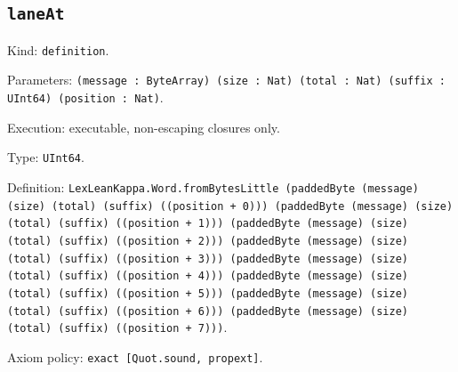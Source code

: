 \documentclass[11pt]{article}
\begin{document}
\subsection*{\texttt{laneAt}}
\noindent Kind: \texttt{definition}.\par
\noindent Parameters: \texttt{(message : ByteArray) (size : Nat) (total : Nat) (suffix : UInt64) (position : Nat)}.\par
\noindent Execution: executable, non-escaping closures only.\par
\noindent Type: \texttt{UInt64}.\par
\noindent Definition: \texttt{LexLeanKappa.Word.fromBytesLittle (paddedByte (message) (size) (total) (suffix) ((position + 0))) (paddedByte (message) (size) (total) (suffix) ((position + 1))) (paddedByte (message) (size) (total) (suffix) ((position + 2))) (paddedByte (message) (size) (total) (suffix) ((position + 3))) (paddedByte (message) (size) (total) (suffix) ((position + 4))) (paddedByte (message) (size) (total) (suffix) ((position + 5))) (paddedByte (message) (size) (total) (suffix) ((position + 6))) (paddedByte (message) (size) (total) (suffix) ((position + 7)))}.\par
\noindent Axiom policy: \texttt{exact [Quot.sound, propext]}.\par
\end{document}
